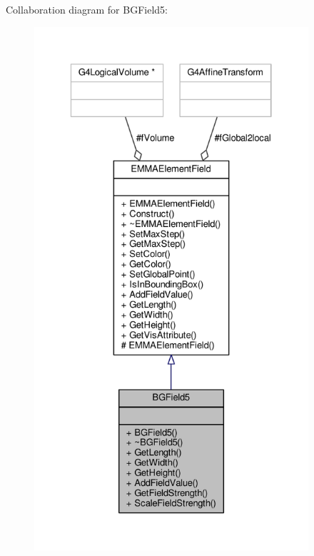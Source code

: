 Collaboration diagram for B\+G\+Field5\+:
\nopagebreak
\begin{figure}[H]
\begin{center}
\leavevmode
\includegraphics[height=550pt]{classBGField5__coll__graph}
\end{center}
\end{figure}
